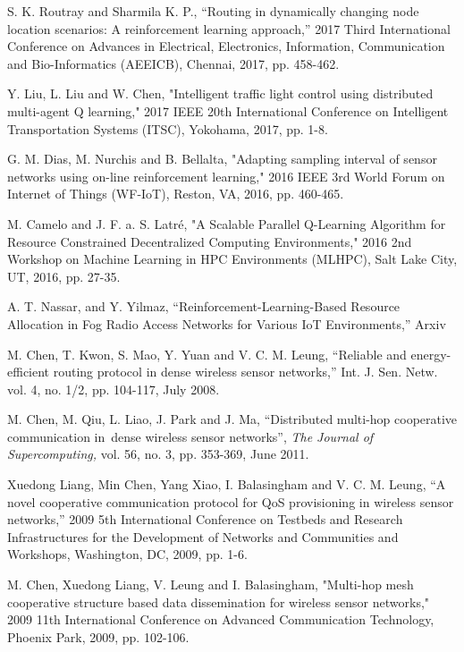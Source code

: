 \documentclass[journal]{IEEEtran}
\begin{document}
\begin{thebibliography}{1}
S. K. Routray and Sharmila K. P., ``Routing in dynamically changing node location scenarios: A reinforcement learning approach,'' 2017 Third International Conference on Advances in Electrical, Electronics, Information, Communication and Bio-Informatics (AEEICB), Chennai, 2017, pp. 458-462.

Y. Liu, L. Liu and W. Chen, "Intelligent traffic light control using distributed multi-agent Q learning," 2017 IEEE 20th International Conference on Intelligent Transportation Systems (ITSC), Yokohama, 2017, pp. 1-8.

G. M. Dias, M. Nurchis and B. Bellalta, "Adapting sampling interval of sensor networks using on-line reinforcement learning," 2016 IEEE 3rd World Forum on Internet of Things (WF-IoT), Reston, VA, 2016, pp. 460-465.

M. Camelo and J. F. a. S. Latré, "A Scalable Parallel Q-Learning Algorithm for Resource Constrained Decentralized Computing Environments," 2016 2nd Workshop on Machine Learning in HPC Environments (MLHPC), Salt Lake City, UT, 2016, pp. 27-35.

A. T. Nassar, and Y. Yilmaz, ``Reinforcement-Learning-Based Resource Allocation in Fog Radio Access Networks for Various IoT Environments,'' Arxiv

M. Chen, T. Kwon, S. Mao, Y. Yuan and V. C. M. Leung, ``Reliable and energy-efficient routing protocol in dense wireless sensor networks,'' Int. J. Sen. Netw.
 vol. 4, no. 1/2, pp. 104-117, July 2008.

M. Chen, M. Qiu, L. Liao, J. Park and J. Ma, ``Distributed multi-hop cooperative communication in dense wireless sensor networks'', \emph{The Journal of Supercomputing,} vol. 56, no. 3, pp. 353-369, June 2011.

Xuedong Liang, Min Chen, Yang Xiao, I. Balasingham and V. C. M. Leung, ``A novel cooperative communication protocol for QoS provisioning in wireless sensor networks,'' 2009 5th International Conference on Testbeds and Research Infrastructures for the Development of Networks and Communities and Workshops, Washington, DC, 2009, pp. 1-6.

M. Chen, Xuedong Liang, V. Leung and I. Balasingham, "Multi-hop mesh cooperative structure based data dissemination for wireless sensor networks," 2009 11th International Conference on Advanced Communication Technology, Phoenix Park, 2009, pp. 102-106.


\end{thebibliography}
\end{document}
